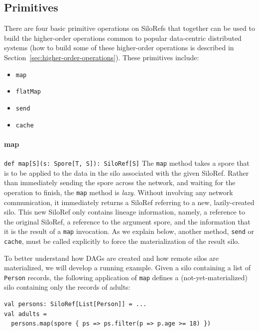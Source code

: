\documentclass[preprint]{sigplanconf}
\theoremstyle{definition}
\theoremstyle{definition}
\begin{document}
\subsection{Primitives}
\label{sec:primitives}

There are four basic primitive operations on SiloRefs that together can be
used to build the higher-order operations common to popular data-centric
distributed systems (how to build some of these higher-order operations is
described in Section~\ref{sec:higher-order-operations}). These primitives
include:

\begin{itemize}[noitemsep,nolistsep]
\item \verb|map|
\item \verb|flatMap|
\item \verb|send|
\item \verb|cache|
\end{itemize}

\paragraph{map} \texttt{def map[S](s: Spore[T, S]): SiloRef[S]}
\newline The \verb|map| method takes a spore that is to be applied to the data
in the silo associated with the given SiloRef. Rather than immediately sending
the spore across the network, and waiting for the operation to finish, the
\verb|map| method is \emph{lazy}. Without involving any network communication,
it immediately returns a SiloRef referring to a new, lazily-created silo. This
new SiloRef only contains lineage information, namely, a reference to the
original SiloRef, a reference to the argument spore, and the information that
it is the result of a \verb|map| invocation. As we explain below, another
method, \verb|send| or \verb|cache|, must be called explicitly to force the
materialization of the result silo.

To better understand how DAGs are created and how remote silos are
materialized, we will develop a running example. Given a silo containing a
list of \verb|Person| records, the following application of \verb|map| defines
a (not-yet-materialized) silo containing only the records of adults:

\begin{lstlisting}
val persons: SiloRef[List[Person]] = ...
val adults =
  persons.map(spore { ps => ps.filter(p => p.age >= 18) })
\end{lstlisting}
\end{document}
